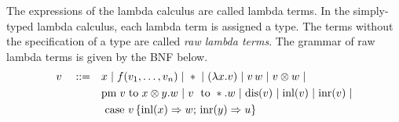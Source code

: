 The expressions of the lambda calculus are called lambda terms. In the simply-typed lambda calculus, each lambda term is assigned a type. The terms without the specification of a type are called \emph{raw lambda terms}. The grammar of raw lambda terms is given by the BNF below.
\begin{equation*} \label{eq:grammarlambda}
\begin{split}
 v\hspace{10 pt} ::= \hspace{10 pt}& x \hspace{3 pt} \vert \hspace{3 pt} f(v_1, \ldots, v_n) \hspace{3 pt} \vert \hspace{3 pt} *  \hspace{3 pt} \vert \hspace{3 pt} (\lambda x. v )\hspace{3 pt} \vert \hspace{3 pt} v\,w \hspace{3 pt}  \vert \hspace{3 pt} v \otimes w \hspace{3 pt} \vert
 \\&    \text{pm} \hspace{3 pt} v \hspace{3 pt} \text{to} \hspace{3 pt} x \otimes y. w  \hspace{3 pt}  \vert \hspace{3 pt} v \hspace{3 pt} \text{ to } *.w \hspace{3 pt} \vert \hspace{3 pt} \text{dis}(v) \hspace{3 pt} \vert \hspace{3 pt} \text{inl} (v) \hspace{3 pt} \vert \hspace{3 pt} \text{inr} (v) \hspace{3 pt} \vert
 \\& \text{ case } v \,   \{\text{inl} (x) \Rightarrow w ; \, \text{inr} (y) \Rightarrow u\}
\end{split}
\end{equation*}

